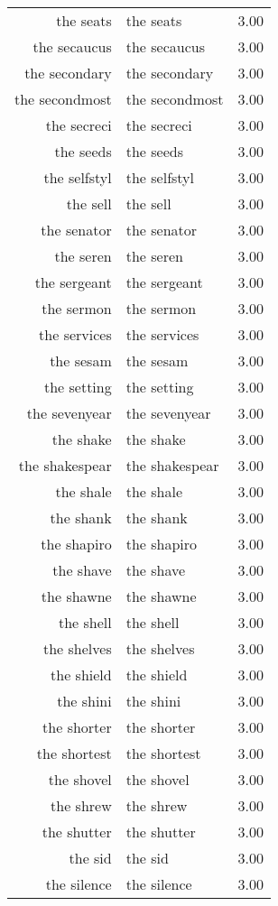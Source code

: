 \begin{table}[ht]
\begin{tabular}{rlr}
  the seats & the seats & 3.00 \\ 
  the secaucus & the secaucus & 3.00 \\ 
  the secondary & the secondary & 3.00 \\ 
  the secondmost & the secondmost & 3.00 \\ 
  the secreci & the secreci & 3.00 \\ 
  the seeds & the seeds & 3.00 \\ 
  the selfstyl & the selfstyl & 3.00 \\ 
  the sell & the sell & 3.00 \\ 
  the senator & the senator & 3.00 \\ 
  the seren & the seren & 3.00 \\ 
  the sergeant & the sergeant & 3.00 \\ 
  the sermon & the sermon & 3.00 \\ 
  the services & the services & 3.00 \\ 
  the sesam & the sesam & 3.00 \\ 
  the setting & the setting & 3.00 \\ 
  the sevenyear & the sevenyear & 3.00 \\ 
  the shake & the shake & 3.00 \\ 
  the shakespear & the shakespear & 3.00 \\ 
  the shale & the shale & 3.00 \\ 
  the shank & the shank & 3.00 \\ 
  the shapiro & the shapiro & 3.00 \\ 
  the shave & the shave & 3.00 \\ 
  the shawne & the shawne & 3.00 \\ 
  the shell & the shell & 3.00 \\ 
  the shelves & the shelves & 3.00 \\ 
  the shield & the shield & 3.00 \\ 
  the shini & the shini & 3.00 \\ 
  the shorter & the shorter & 3.00 \\ 
  the shortest & the shortest & 3.00 \\ 
  the shovel & the shovel & 3.00 \\ 
  the shrew & the shrew & 3.00 \\ 
  the shutter & the shutter & 3.00 \\ 
  the sid & the sid & 3.00 \\ 
  the silence & the silence & 3.00 \\ 

\end{tabular}
\end{table}
